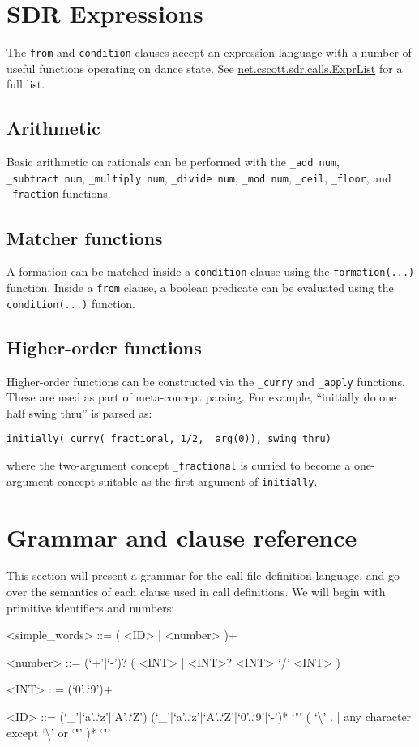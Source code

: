 \documentclass[12pt]{article}
\newcommand{\clause}[1]{\texttt{#1}}
\newcommand{\expr}[1]{\texttt{#1}}
\newcommand{\package}[1]{\url{#1}}
\begin{document}
\section{SDR Expressions}
The \clause{from} and \clause{condition} clauses accept an expression
language with a number of useful functions operating on dance state.
See \package{net.cscott.sdr.calls.ExprList} for a full list.

\subsection{Arithmetic}
Basic arithmetic on rationals can be performed with the \expr{\_add~num},
\expr{\_subtract~num}, \expr{\_multiply~num}, \expr{\_divide~num},
\expr{\_mod~num}, \expr{\_ceil}, \expr{\_floor}, and \expr{\_fraction}
functions.

\subsection{Matcher functions}
A formation can be matched inside a \clause{condition} clause using
the \expr{formation(...)} function.  Inside a \clause{from} clause, a
boolean predicate can be evaluated using the \expr{condition(...)}
function.

\subsection{Higher-order functions}
Higher-order functions can be constructed via the \expr{\_curry} and
\expr{\_apply} functions.  These are used as part of meta-concept
parsing.  For example, ``initially do one half swing thru'' is
parsed as:
\begin{lstlisting}
initially(_curry(_fractional, 1/2, _arg(0)), swing thru)
\end{lstlisting}
where the two-argument concept \expr{\_fractional} is curried to
become a one-argument concept suitable as the first argument of
\expr{initially}.

\section{Grammar and clause reference}
This section will present a grammar for the call file definition
language, and go over the semantics of each clause used in call
definitions.  We will begin with primitive identifiers and numbers:
\begin{grammar}
<simple_words> ::= ( <ID> | <number> )+

<number> ::= (`+'|`-')? ( <INT> | <INT>? <INT> `/' <INT> )

<INT> ::= (`0'..`9')+

<ID> ::= (`_'|`a'..`z'|`A'..`Z') (`_'|`a'..`z'|`A'..`Z'|`0'..`9'|`-')*
     \alt `"' ( `\textbackslash' . | any character except `\textbackslash' or `"' )* `"'
\end{grammar}
\end{document}
